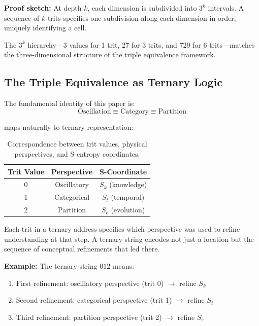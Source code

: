 \textbf{Proof sketch:} At depth $k$, each dimension is subdivided into $3^k$ intervals. A sequence of $k$ trits specifies one subdivision along each dimension in order, uniquely identifying a cell.

The $3^k$ hierarchy—3 values for 1 trit, 27 for 3 trits, and 729 for 6 trits—matches the three-dimensional structure of the triple equivalence framework.



\subsection{The Triple Equivalence as Ternary Logic}

The fundamental identity of this paper is:
\begin{equation}
\text{Oscillation} \equiv \text{Category} \equiv \text{Partition}
\end{equation}

maps naturally to ternary representation:

\begin{table}[h]
\centering
\begin{tabular}{ccc}
\hline
\textbf{Trit Value} & \textbf{Perspective} & \textbf{S-Coordinate} \\
\hline
0 & Oscillatory & $S_k$ (knowledge) \\
1 & Categorical & $S_t$ (temporal) \\
2 & Partition & $S_e$ (evolution) \\
\hline
\end{tabular}
\caption{Correspondence between trit values, physical perspectives, and S-entropy coordinates.}
\label{tab:trit_correspondence}
\end{table}

Each trit in a ternary address specifies which perspective was used to refine understanding at that step. A ternary string encodes not just a location but the sequence of conceptual refinements that led there.

\textbf{Example:} The ternary string $012$ means:
\begin{enumerate}
\item First refinement: oscillatory perspective (trit 0) $\to$ refine $S_k$
\item Second refinement: categorical perspective (trit 1) $\to$ refine $S_t$
\item Third refinement: partition perspective (trit 2) $\to$ refine $S_e$
\end{enumerate}

